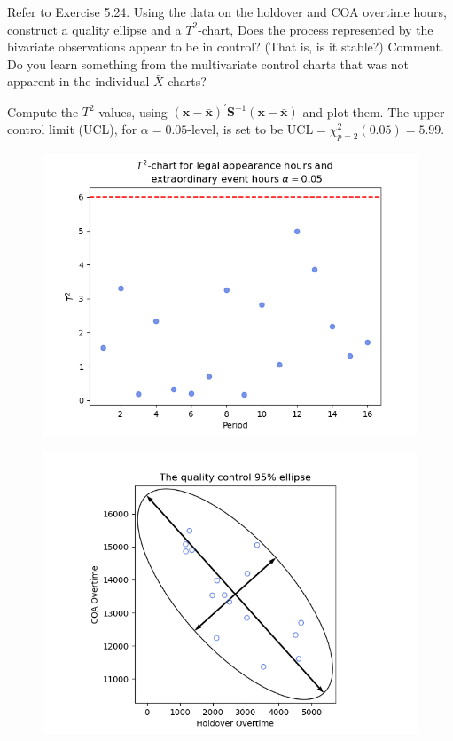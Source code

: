 Refer to Exercise 5.24. Using the data on the holdover and COA overtime hours, construct
a quality ellipse and a $T^{2}$-chart, Does the process represented by the bivariate
observations appear to be in control? (That is, is it stable?) Comment. Do you learn
something from the multivariate control charts that was not apparent in the individual $\bar{X}$-charts?
\par
Compute the $T^{2}$ values, using ${(\textbf{x} - \bar{\textbf{x}})}^{\prime} \textbf{S}^{-1} {(\textbf{x} - \bar{\textbf{x}})}$ and plot them. The upper control limit (UCL), for $\alpha=0.05$-level, is set to be $\text{UCL} = \chi_{p=2}^{2}(0.05) = 5.99$.

\begin{figure}[H]
    \centering
    \includegraphics[scale=0.65]{./python/chapter-5/Question-5-25-T2.png}
\end{figure}

\begin{figure}[H]
    \centering
    \includegraphics[scale=0.65]{./python/chapter-5/Question-5-25-QC-Ellipse.png}
\end{figure}


